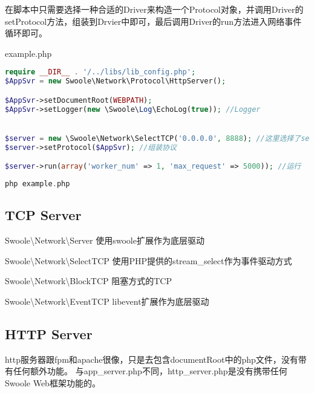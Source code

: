 在脚本中只需要选择一种合适的Driver来构造一个Protocol对象，并调用Driver的setProtocol方法，组装到Drvier中即可，最后调用Driver的run方法进入网络事件循环即可。


\begin{example}
example.php
\begin{lstlisting}[language=PHP]
require __DIR__ . '/../libs/lib_config.php';
$AppSvr = new Swoole\Network\Protocol\HttpServer();

$AppSvr->setDocumentRoot(WEBPATH);
$AppSvr->setLogger(new \Swoole\Log\EchoLog(true)); //Logger


$server = new \Swoole\Network\SelectTCP('0.0.0.0', 8888); //这里选择了selectTCP驱动
$server->setProtocol($AppSvr); //组装协议

$server->run(array('worker_num' => 1, 'max_request' => 5000)); //运行
\end{lstlisting}
\end{example}


\begin{lstlisting}[language=PHP]
php example.php
\end{lstlisting}

\subsection{TCP Server}


\begin{compactitem}
\item Swoole\textbackslash Network\textbackslash Server 使用swoole扩展作为底层驱动
\item Swoole\textbackslash Network\textbackslash SelectTCP 使用PHP提供的stream\_select作为事件驱动方式
\item Swoole\textbackslash Network\textbackslash BlockTCP 阻塞方式的TCP
\item Swoole\textbackslash Network\textbackslash EventTCP libevent扩展作为底层驱动
\end{compactitem}

\subsection{HTTP Server}


http服务器跟fpm和apache很像，只是去包含documentRoot中的php文件，没有带有任何额外功能。 与app\_server.php不同，http\_server.php是没有携带任何Swoole Web框架功能的。



